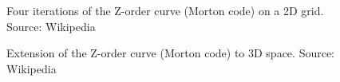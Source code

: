 \begin{figure}[thp]
    \begin{center}
    \end{center}
    \caption{Four iterations of the Z-order curve (Morton code) on a 2D grid. Source: Wikipedia}
    \label{fig:morton}
\end{figure}

\begin{figure}[thp]
    \begin{center}
    \end{center}
    \caption{Extension of the Z-order curve (Morton code) to 3D space. Source: Wikipedia}
    \label{fig:morton_3d}
\end{figure}

